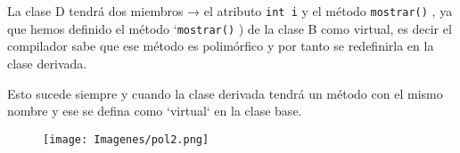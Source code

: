 La clase D tendrá dos miembros → el atributo \texttt{int i} y el método \texttt{mostrar()} , ya que hemos definido el método `\texttt{mostrar()} ) de la clase B como virtual, es decir el compilador sabe que ese método es polimórfico y por tanto se redefinirla en la clase derivada.

Esto sucede siempre y cuando la clase derivada tendrá un método con el mismo nombre y ese se defina como `virtual` en la clase base.
\begin{figure}[h]
	\begin{center}
		\texttt{[image: Imagenes/pol2.png]}
	\end{center}
\end{figure}

